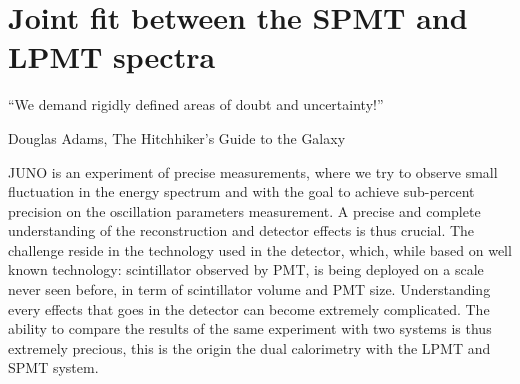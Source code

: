 \documentclass[../main.tex]{subfiles}
\begin{document}
\chapter{Joint fit between the SPMT and LPMT spectra}
\epigraph{``We demand rigidly defined areas of doubt and uncertainty!''}{Douglas Adams, The Hitchhiker’s Guide to the Galaxy}
\label{sec:joint_fit}
%
%
%
%
%
%
%

JUNO is an experiment of precise measurements, where we try to observe small fluctuation in the energy spectrum and with the goal to achieve sub-percent precision on the oscillation parameters measurement.
A precise and complete understanding of the reconstruction and detector effects is thus crucial.
The challenge reside in the technology used in the detector, which, while based on well known technology: scintillator observed by PMT, is being deployed on a scale never seen before, in term of scintillator volume and  PMT size. Understanding every effects that goes in the detector can become extremely complicated. The ability to compare the results of the same experiment with two systems is thus extremely precious, this is the origin the dual calorimetry with the LPMT and SPMT system.
\end{document}
